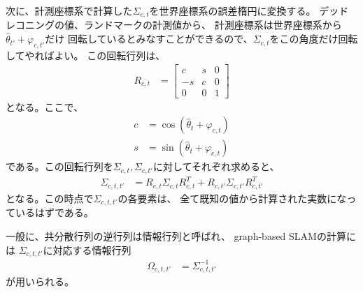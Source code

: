 次に、計測座標系で計算した$\Sigma_{c,t}$を世界座標系の誤差楕円に変換する。
デッドレコニングの値、ランドマークの計測値から、
計測座標系は世界座標系から$\hat{\theta}_{t'} + \varphi_{c,t'}$だけ
回転しているとみなすことができるので、$\Sigma_{c,t}$をこの角度だけ回転してやればよい。
この回転行列は、
\begin{align}
	R_{c,t} &=
	\begin{bmatrix}
	c & s  & 0 \\
	-s & c & 0 \\
	0 & 0 & 1
	\end{bmatrix}
\end{align}
となる。ここで、
\begin{align}
	c &= \cos(\hat{\theta}_{t} + \varphi_{c,t}) \nonumber \\
	s &= \sin(\hat{\theta}_{t} + \varphi_{c,t}) \nonumber 
\end{align}
である。この回転行列を$\Sigma_{c,t}, \Sigma_{c,t'}$に対してそれぞれ求めると、
\begin{align}
	\Sigma_{c,t,t'} &= R_{c,t}\Sigma_{c,t}R_{c,t}^T + R_{c,t'}\Sigma_{c,t'}R_{c,t'}^T
\end{align}
となる。この時点で$\Sigma_{c,t,t'}$の各要素は、
全て既知の値から計算された実数になっているはずである。

一般に、共分散行列の逆行列は情報行列と呼ばれ、
graph-based SLAMの計算には
$\Sigma_{c,t,t'}$に対応する情報行列
\begin{align}
	\Omega_{c,t,t'} &= \Sigma_{c,t,t'}^{-1}
\end{align}
が用いられる。

